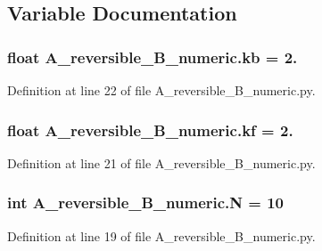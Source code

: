 \subsection{Variable Documentation}
\hypertarget{namespaceA__reversible__B__numeric_a2f4e77a45b10e727874ecd0a83be77fd}{
\subsubsection[{kb}]{\setlength{\rightskip}{0pt plus 5cm}float A\+\_\+reversible\+\_\+\+B\+\_\+numeric.\+kb = 2.}}\label{namespaceA__reversible__B__numeric_a2f4e77a45b10e727874ecd0a83be77fd}


Definition at line 22 of file A\+\_\+reversible\+\_\+\+B\+\_\+numeric.\+py.

\hypertarget{namespaceA__reversible__B__numeric_a772b5e72a16864c6d0d2895bf2bb5ada}{
\subsubsection[{kf}]{\setlength{\rightskip}{0pt plus 5cm}float A\+\_\+reversible\+\_\+\+B\+\_\+numeric.\+kf = 2.}}\label{namespaceA__reversible__B__numeric_a772b5e72a16864c6d0d2895bf2bb5ada}


Definition at line 21 of file A\+\_\+reversible\+\_\+\+B\+\_\+numeric.\+py.

\hypertarget{namespaceA__reversible__B__numeric_ac17162d2d7790ca7d605541ee4c919bb}{
\subsubsection[{N}]{\setlength{\rightskip}{0pt plus 5cm}int A\+\_\+reversible\+\_\+\+B\+\_\+numeric.\+N = 10}}\label{namespaceA__reversible__B__numeric_ac17162d2d7790ca7d605541ee4c919bb}


Definition at line 19 of file A\+\_\+reversible\+\_\+\+B\+\_\+numeric.\+py.



